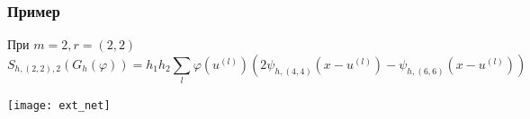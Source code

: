 \documentclass[pdf, 9pt, unicode]{beamer} %
\begin{document}
\begin{frame}
  \frametitle{Пример}


\begin{block}{При $m=2, r=(2,2)$}
$$
S_{h,(2,2),2}(G_{h}(\varphi)) = h_1 h_2 \sum_l \varphi(u^{(l)})\left(2 \psi_{h,(4,4)}(x-u^{(l)}) - \psi_{h,(6,6)}(x-u^{(l)})\right)
$$ 

\end{block}


\label{ext_net}
\centering
\begin{minipage}[h]{0.6\linewidth}
\texttt{[image: ext\_net]}
\end{minipage}



\end{frame}
\end{document}
